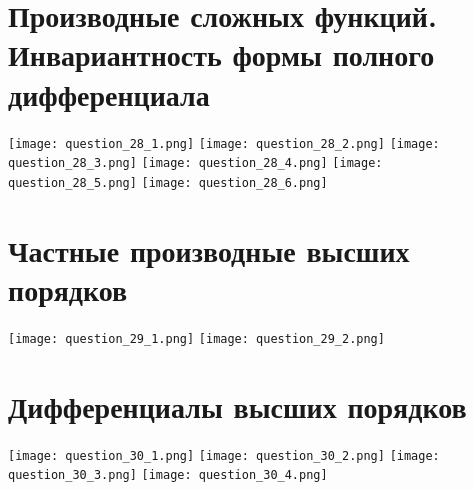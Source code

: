\documentclass[a4paper,12pt]{article}
\begin{document}
\section{Производные сложных функций. Инвариантность формы полного дифференциала}
\texttt{[image: question\_28\_1.png]}
\texttt{[image: question\_28\_2.png]}
\texttt{[image: question\_28\_3.png]}
\texttt{[image: question\_28\_4.png]}
\texttt{[image: question\_28\_5.png]}
\texttt{[image: question\_28\_6.png]}

\section{Частные производные высших порядков}
\texttt{[image: question\_29\_1.png]}
\texttt{[image: question\_29\_2.png]}

\section{Дифференциалы высших порядков}
\texttt{[image: question\_30\_1.png]}
\texttt{[image: question\_30\_2.png]}
\texttt{[image: question\_30\_3.png]}
\texttt{[image: question\_30\_4.png]}
\end{document}
